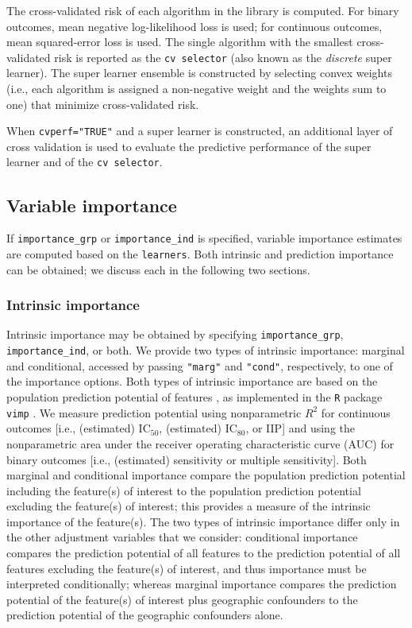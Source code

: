 \documentclass[
]{article}
\begin{document}
The cross-validated risk of each algorithm in the library is computed. For binary outcomes, mean negative log-likelihood loss is used; for continuous outcomes, mean squared-error loss is used. The single algorithm with the smallest cross-validated risk is reported as the \texttt{cv\ selector} (also known as the \emph{discrete} super learner). The super learner ensemble is constructed by selecting convex weights (i.e., each algorithm is assigned a non-negative weight and the weights sum to one) that minimize cross-validated risk.

When \texttt{cvperf="TRUE"} and a super learner is constructed, an additional layer of cross validation is used to evaluate the predictive performance of the super learner and of the \texttt{cv\ selector}.

\hypertarget{variable-importance}{%
\subsection{Variable importance}\label{variable-importance}}

If \texttt{importance\_grp} or \texttt{importance\_ind} is specified, variable importance estimates are computed based on the \texttt{learners}. Both intrinsic and prediction importance can be obtained; we discuss each in the following two sections.

\hypertarget{sec:biolimp}{%
\subsubsection{Intrinsic importance}\label{sec:biolimp}}

Intrinsic importance may be obtained by specifying \texttt{importance\_grp}, \texttt{importance\_ind}, or both. We provide two types of intrinsic importance: marginal and conditional, accessed by passing \texttt{"marg"} and \texttt{"cond"}, respectively, to one of the importance options. Both types of intrinsic importance are based on the population prediction potential of features \citep{williamson2020}, as implemented in the \texttt{R} package \texttt{vimp} \citep{vimppkg}. We measure prediction potential using nonparametric \(R^2\) for continuous outcomes {[}i.e., (estimated) IC\(_{50}\), (estimated) IC\(_{80}\), or IIP{]} and using the nonparametric area under the receiver operating characteristic curve (AUC) for binary outcomes {[}i.e., (estimated) sensitivity or multiple sensitivity{]}. Both marginal and conditional importance compare the population prediction potential including the feature(s) of interest to the population prediction potential excluding the feature(s) of interest; this provides a measure of the intrinsic importance of the feature(s). The two types of intrinsic importance differ only in the other adjustment variables that we consider: conditional importance compares the prediction potential of all features to the prediction potential of all features excluding the feature(s) of interest, and thus importance must be interpreted conditionally; whereas marginal importance compares the prediction potential of the feature(s) of interest plus geographic confounders to the prediction potential of the geographic confounders alone.
\end{document}
